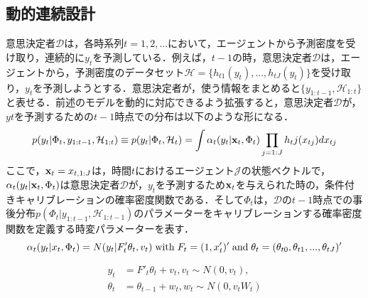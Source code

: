\documentclass[11pt,a4paper]{article}
\begin{document}
\subsection{動的連続設計}
意思決定者$\mathcal{D}$は，各時系列$t = 1,2,...$において，エージェントから予測密度を受け取り，連続的に$y_t$を予測している．例えば，$t-1$の時，意思決定者$\mathcal{D}$は，エージェントから，予測密度のデータセット$\mathcal{H} = \{h_{t1}(y_t),...,h_{tJ}(y_t)\}$を受け取り，$y_t$を予測しようとする．意思決定者が，使う情報をまとめると$\{y_{1:t-1},\mathcal{H}_{1:t}\}$と表せる．前述のモデルを動的に対応できるよう拡張すると，意思決定者$\mathcal{D}$が，$yt$を予測するための$t-1$時点での分布は以下のような形になる．
\[
p(y_t|\Phi_t,y_{1:t-1},\mathcal{H}_{1:t}) \equiv p(y_t|\Phi_t,\mathcal{H}_t) = \int \alpha_t(y_t|{\bf x}_t,\Phi_t) \prod_{j=1:J} h_tj(x_{tj})dx_{tj}
\]
ここで，${\bf x}_t = x_{t,1:J}$は，時間$t$におけるエージェント$\mathcal{J}$の状態ベクトルで，$\alpha_t(y_t|{\bf x}_t,\Phi_t)$は意思決定者$\mathcal{D}$が，$y_t$を予測するため${\bf x}_t$を与えられた時の，条件付きキャリブレーションの確率密度関数である．そして$\Phi_t$は，$\mathcal{D}$の$t-1$時点での事後分布$p(\Phi_t|y_{1:t-1},\mathcal{H}_{1:t-1})$のパラメーターをキャリブレーションする確率密度関数を定義する時変パラメーターを表す．
\[
\alpha_t(y_t|x_t,\Phi_t) = N(y_t|F'_t\theta_t,v_t) \;{\rm with}\; F_t = (1,x'_t)' \;{\rm and}\; \theta_t = (\theta_{t0},\theta_{t1},...,\theta_{tJ})'
\]

\begin{equation}
\begin{split}
y_t &= F'_t\theta_t + v_t,   v_t \sim N(0,v_t),\\
\theta_t &= \theta_{t-1} + w_t, w_t \sim N(0,v_tW_t)
\end{split}
\label{ons1}
\end{equation}
\end{document}

